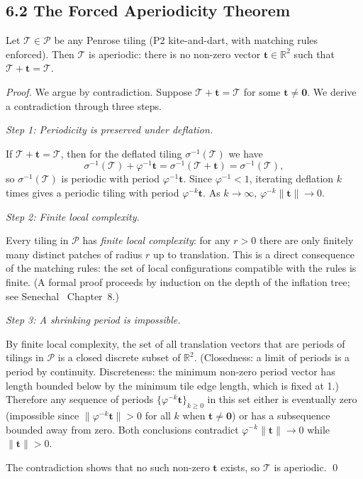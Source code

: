 \subsection{6.2 The Forced Aperiodicity
Theorem}\label{sec:forced-aperiodicity-statement}

\begin{theorem}
\label{thm:penrose-aperiodic}
Let \(\mathcal{T} \in \mathcal{P}\) be any Penrose
tiling (P2 kite-and-dart, with matching rules
enforced). Then \(\mathcal{T}\) is aperiodic: there
is no non-zero vector \(\mathbf{t} \in \mathbb{R}^2\)
such that \(\mathcal{T} + \mathbf{t} = \mathcal{T}\).
\end{theorem}

\begin{proof}
We argue by contradiction. Suppose
\(\mathcal{T} + \mathbf{t} = \mathcal{T}\) for some
\(\mathbf{t} \neq \mathbf{0}\). We derive a
contradiction through three steps.

\medskip
\noindent\textit{Step 1: Periodicity is preserved under deflation.}

If \(\mathcal{T} + \mathbf{t} = \mathcal{T}\), then
for the deflated tiling \(\sigma^{-1}(\mathcal{T})\)
we have
\[
  \sigma^{-1}(\mathcal{T}) + \varphi^{-1}\mathbf{t}
    = \sigma^{-1}(\mathcal{T} + \mathbf{t})
    = \sigma^{-1}(\mathcal{T}),
\]
so \(\sigma^{-1}(\mathcal{T})\) is periodic with
period \(\varphi^{-1}\mathbf{t}\). Since
\(\varphi^{-1} < 1\), iterating deflation
\(k\) times gives a periodic tiling with period
\(\varphi^{-k}\mathbf{t}\). As \(k \to \infty\),
\(\varphi^{-k}\|\mathbf{t}\| \to 0\).

\medskip
\noindent\textit{Step 2: Finite local complexity.}

Every tiling in \(\mathcal{P}\) has \emph{finite
local complexity}: for any \(r > 0\) there are
only finitely many distinct patches of radius
\(r\) up to translation. This is a direct
consequence of the matching rules: the set of
local configurations compatible with the rules is
finite. (A formal proof proceeds by induction on
the depth of the inflation tree; see
Senechal~\cite{senechal_quasicrystals} Chapter~8.)

\medskip
\noindent\textit{Step 3: A shrinking period is impossible.}

By finite local complexity, the set of all
translation vectors that are periods of tilings in
\(\mathcal{P}\) is a closed discrete subset of
\(\mathbb{R}^2\). (Closedness: a limit of periods
is a period by continuity. Discreteness: the
minimum non-zero period vector has length bounded
below by the minimum tile edge length, which is
fixed at 1.) Therefore any sequence of periods
\(\{\varphi^{-k}\mathbf{t}\}_{k \geq 0}\) in this
set either is eventually zero (impossible since
\(\|\varphi^{-k}\mathbf{t}\| > 0\) for all \(k\)
when \(\mathbf{t} \neq \mathbf{0}\)) or has a
subsequence bounded away from zero. Both
conclusions contradict
\(\varphi^{-k}\|\mathbf{t}\| \to 0\) while
\(\|\mathbf{t}\| > 0\).

\medskip
\noindent
The contradiction shows that no such non-zero
\(\mathbf{t}\) exists, so \(\mathcal{T}\) is
aperiodic. \qed
\end{proof}

